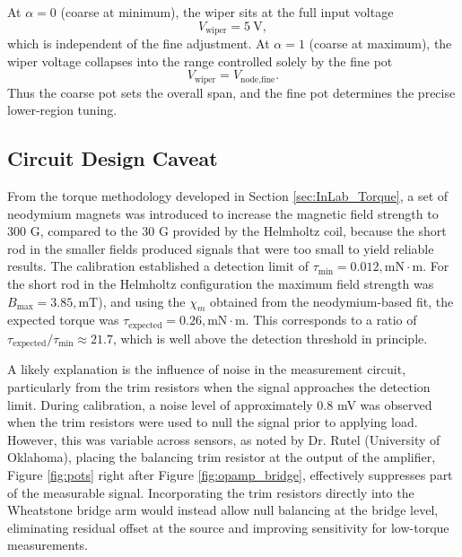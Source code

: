 At $\alpha=0$ (coarse at minimum), the wiper sits at the full input voltage
\begin{equation}
V_{\text{wiper}} = 5~\text{V},
\end{equation}
which is independent of the fine adjustment.  
At $\alpha=1$ (coarse at maximum), the wiper voltage collapses into the range controlled solely by the fine pot
\begin{equation}
V_{\text{wiper}} = V_{\text{node,fine}}.
\end{equation}
Thus the coarse pot sets the overall span,  
and the fine pot determines the precise lower-region tuning.

\subsection{Circuit Design Caveat}
\label{app:circuit_caveat}

From the torque methodology developed in Section \ref{sec:InLab_Torque}, a set of neodymium magnets was introduced to increase the magnetic field strength to 300 G, compared to the 30 G provided by the Helmholtz coil, because the short rod in the smaller fields produced signals that were too small to yield reliable results. The calibration established a detection limit of $\tau_{\min} = 0.012,\text{mN}\cdot\text{m}$. For the short rod in the Helmholtz configuration the maximum field strength was $B_{\max} = 3.85,\text{mT}$), and using the $\chi_m$ obtained from the neodymium-based fit, the expected torque was $\tau_{\text{expected}} = 0.26,\text{mN}\cdot\text{m}$. This corresponds to a ratio of $\tau_{\text{expected}} / \tau_{\min} \approx 21.7$, which is well above the detection threshold in principle.

A likely explanation is the influence of noise in the measurement circuit, particularly from the trim resistors when the signal approaches the detection limit. During calibration, a noise level of approximately 0.8 mV was observed when the trim resistors were used to null the signal prior to applying load. However, this was variable across sensors, as noted by Dr. Rutel (University of Oklahoma), placing the balancing trim resistor at the output of the amplifier, Figure \ref{fig:pots} right after Figure \ref{fig:opamp_bridge}, effectively suppresses part of the measurable signal. Incorporating the trim resistors directly into the Wheatstone bridge arm would instead allow null balancing at the bridge level, eliminating residual offset at the source and improving sensitivity for low-torque measurements.


